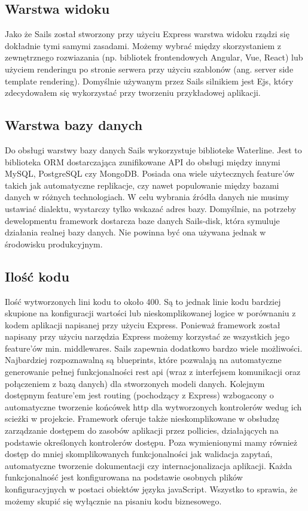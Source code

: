\documentclass[12pt]{report}
\begin{document}
    \subsection{Warstwa widoku}
      Jako że Sails został stworzony przy użyciu Express warstwa widoku rządzi się dokładnie tymi samymi zasadami.
      Możemy wybrać między skorzystaniem z zewnętrznego rozwiazania (np. bibliotek frontendowych Angular, Vue, React) lub użyciem renderingu po stronie serwera przy użyciu szablonów (ang. server side template rendering).
      Domyślnie używanym przez Sails silnikiem jest Ejs, który zdecydowałem się wykorzystać przy tworzeniu przykładowej aplikacji.

    \subsection{Warstwa bazy danych}
      Do obsługi warstwy bazy danych Sails wykorzystuje biblioteke Waterline.
      Jest to biblioteka ORM dostarczająca zunifikowane API do obsługi między innymi MySQL, PostgreSQL czy MongoDB.
      Posiada ona wiele użytecznych feature'ów takich jak automatyczne replikacje, czy nawet populowanie między bazami danych w różnych technologiach. 
      W celu wybrania źródła danych nie musimy ustawiać dialektu, wystarczy tylko wskazać adres bazy.
      Domyślnie, na potrzeby dewelopmentu framework dostarcza baze danych Sails-disk, która symuluje działania realnej bazy danych.
      Nie powinna być ona używana jednak w środowisku produkcyjnym.

    \subsection{Ilość kodu}
      Ilość wytworzonych lini kodu to około 400.
      Są to jednak linie kodu bardziej skupione na konfiguracji wartości lub nieskomplikowanej logice w porównaniu z kodem aplikacji napisanej przy użyciu Express.
      Ponieważ framework został napisany przy użyciu narzędzia Express możemy korzystać ze wszystkich jego feature'ów min. middlewares.
      Sails zapewnia dodatkowo bardzo wiele możliwości.
      Najbardziej rozpoznawalną są blueprints, które pozwalają na automatyczne generowanie pełnej funkcjonalności rest api (wraz z interfejsem komunikacji oraz połączeniem z bazą danych) dla stworzonych modeli danych.
      Kolejnym dostępnym feature'em jest routing (pochodzący z Express) wzbogacony o automatyczne tworzenie końcówek http dla wytworzonych kontrolerów wedug ich scieżki w projekcie.
      Framework oferuje także nieskomplikowane w obsłudzę zarządzanie dostępem do zasobów aplikacji przez pollicies, działających na podstawie określonych kontrolerów dostępu.
      Poza wymienionymi mamy również dostęp do mniej skomplikowanych funkcjonalności jak walidacja zapytań, automatyczne tworzenie dokumentacji czy internacjonalizacja aplikacji.
      Każda funkcjonalność jest konfigurowana na podstawie osobnych plików konfiguracyjnych w postaci obiektów języka javaScript.
      Wszystko to sprawia, że możemy skupić się wyłącznie na pisaniu kodu biznesowego.
\end{document}
